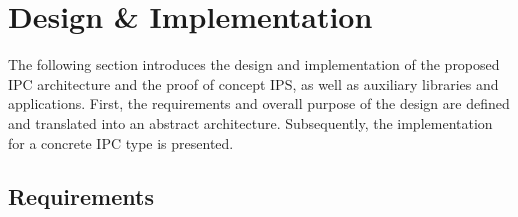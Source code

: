 %
%
\chapter{Design \& Implementation}
\label{sec:design}

The following section introduces the design and implementation of the proposed \ac{IPC} architecture and the proof of concept \ac{IPS}, as well as auxiliary libraries and applications.
First, the requirements and overall purpose of the design are defined and translated into an abstract architecture. Subsequently, the implementation for a concrete \ac{IPC} type is presented.


\section{Requirements}

